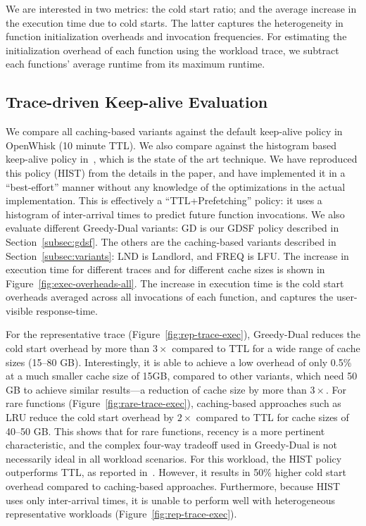 We are interested in two metrics: the cold start ratio; and the average increase in the execution time due to cold starts. 
The latter captures the heterogeneity in function initialization overheads and invocation frequencies. 
For estimating the initialization overhead of each function using the workload trace, we subtract each functions' average runtime from its maximum runtime. 

\subsection{Trace-driven Keep-alive Evaluation}
\vspace*{\subsecspace}

We compare all caching-based variants against the default keep-alive policy in OpenWhisk (10 minute TTL). 
We also compare against the histogram based keep-alive policy in~\cite{shahrad_serverless_2020}, which is the state of the art technique. 
We have reproduced this policy (HIST) from the details in the paper, and have implemented it in a ``best-effort'' manner without any knowledge of the optimizations in the actual implementation. 
This is effectively a ``TTL+Prefetching'' policy: it uses a histogram of inter-arrival times to predict future function invocations. 
We also evaluate different Greedy-Dual variants: GD is our GDSF policy described in Section~\ref{subsec:gdsf}.
The others are the caching-based variants described in Section~\ref{subsec:variants}: LND is Landlord, and FREQ is LFU. 
%
The increase in execution time for different traces and for different cache sizes is shown in Figure~\ref{fig:exec-overheads-all}.
The increase in execution time is the cold start overheads averaged across all invocations of each function, and captures the user-visible response-time. 
%

For the representative trace (Figure~\ref{fig:rep-trace-exec}), Greedy-Dual reduces the cold start overhead by more than $3\times$ compared to TTL for a wide range of cache sizes (15--80 GB). 
Interestingly, it is able to achieve a low overhead of only 0.5\% at a much smaller cache size of 15GB, compared to other variants, which need 50 GB to achieve similar results---a reduction of cache size by more than $3\times$. 
%
For rare functions (Figure~\ref{fig:rare-trace-exec}), caching-based approaches such as LRU  reduce the cold start overhead by $2\times$ compared to TTL for cache sizes of 40--50 GB. 
This shows that for rare functions, recency is a more pertinent characteristic, and the complex four-way tradeoff used in Greedy-Dual is not necessarily ideal in all workload scenarios. 
For this workload, the HIST policy outperforms TTL, as reported in~\cite{shahrad_serverless_2020}. 
However, it results in 50\% higher cold start overhead compared to caching-based approaches.
Furthermore, because HIST uses only inter-arrival times, it is unable to perform well with heterogeneous representative workloads  (Figure~\ref{fig:rep-trace-exec}). 


